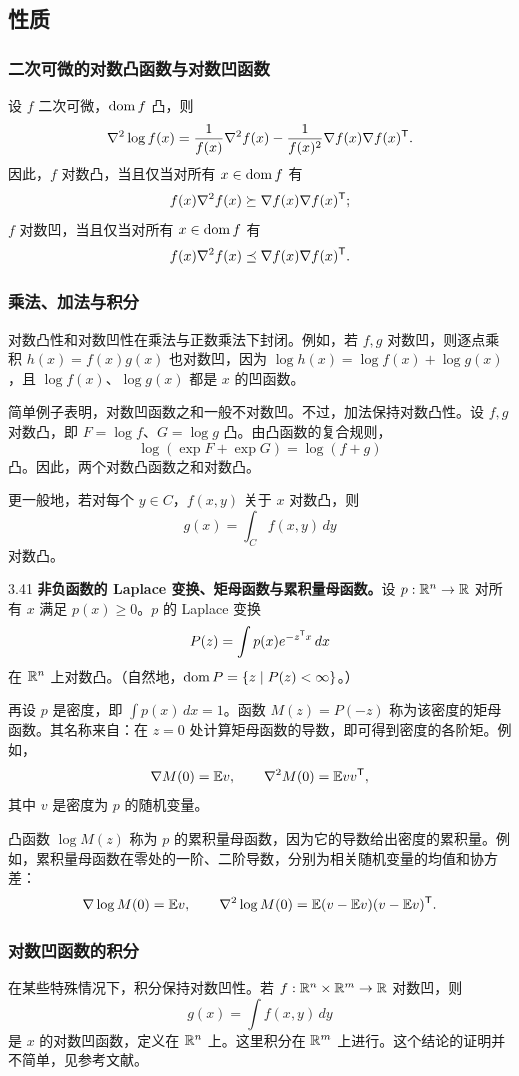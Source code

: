 \subsection{性质}
\subsubsection*{二次可微的对数凸函数与对数凹函数}
设 $f$ 二次可微，$\operatorname{dom} f$ 凸，则
\[\nabla^2\log f(x)=\frac1{f(x)}\nabla^2 f(x)
 -\frac1{f(x)^2}\nabla f(x)\nabla f(x)^\mathsf T.\]
因此，$f$ 对数凸，当且仅当对所有 $x\in\operatorname{dom} f$ 有
\[f(x)\nabla^2 f(x)\succeq\nabla f(x)\nabla f(x)^\mathsf T;\]
$f$ 对数凹，当且仅当对所有 $x\in\operatorname{dom} f$ 有
\[f(x)\nabla^2 f(x)\preceq\nabla f(x)\nabla f(x)^\mathsf T.\]
\subsubsection*{乘法、加法与积分}
对数凸性和对数凹性在乘法与正数乘法下封闭。例如，若 $f,g$ 对数凹，则逐点乘积 $h(x)=f(x)g(x)$ 也对数凹，因为 $\log h(x)=\log f(x)+\log g(x)$，且 $\log f(x)$、$\log g(x)$ 都是 $x$ 的凹函数。

简单例子表明，对数凹函数之和一般不对数凹。不过，加法保持对数凸性。设 $f,g$ 对数凸，即 $F=\log f$、$G=\log g$ 凸。由凸函数的复合规则，
\[\log(\exp F+\exp G)=\log(f+g)\]
凸。因此，两个对数凸函数之和对数凸。

更一般地，若对每个 $y\in C$，$f(x,y)$ 关于 $x$ 对数凸，则
\[g(x)=\int_C f(x,y)\,dy\]
对数凸。
\begin{origexample}{3.41}
\textbf{非负函数的 Laplace 变换、矩母函数与累积量母函数。}设 $p:\mathbb R^n\to\mathbb R$ 对所有 $x$ 满足 $p(x)\geq0$。$p$ 的 Laplace 变换
\[P(z)=\int p(x)e^{-z^\mathsf T x}\,dx\]
在 $\mathbb R^n$ 上对数凸。（自然地，$\operatorname{dom} P=\{z\mid P(z)<\infty\}$。）

再设 $p$ 是密度，即 $\int p(x)\,dx=1$。函数 $M(z)=P(-z)$ 称为该密度的矩母函数。其名称来自：在 $z=0$ 处计算矩母函数的导数，即可得到密度的各阶矩。例如，
\[\nabla M(0)=\mathbb E v,\qquad\nabla^2M(0)=\mathbb E vv^\mathsf T,\]
其中 $v$ 是密度为 $p$ 的随机变量。

凸函数 $\log M(z)$ 称为 $p$ 的累积量母函数，因为它的导数给出密度的累积量。例如，累积量母函数在零处的一阶、二阶导数，分别为相关随机变量的均值和协方差：
\[\nabla\log M(0)=\mathbb E v,\qquad
 \nabla^2\log M(0)=\mathbb E(v-\mathbb E v)(v-\mathbb E v)^\mathsf T.\]
\end{origexample}
\subsubsection*{对数凹函数的积分}
在某些特殊情况下，积分保持对数凹性。若 $f:\mathbb R^n\times\mathbb R^m\to\mathbb R$ 对数凹，则
\[g(x)=\int f(x,y)\,dy\]
是 $x$ 的对数凹函数，定义在 $\mathbb R^n$ 上。这里积分在 $\mathbb R^m$ 上进行。这个结论的证明并不简单，见参考文献。

